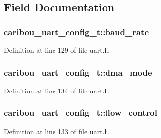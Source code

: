 \subsection{Field Documentation}
\hypertarget{structcaribou__uart__config__t_a6138aeea535f2b07ffe791cf77805e78}{
\subsubsection[{baud\-\_\-rate}]{ caribou\-\_\-uart\-\_\-config\-\_\-t\-::baud\-\_\-rate}}\label{structcaribou__uart__config__t_a6138aeea535f2b07ffe791cf77805e78}


Definition at line 129 of file uart.\-h.

\hypertarget{structcaribou__uart__config__t_a257b346e7b980b0f2b089f27cc54569d}{
\subsubsection[{dma\-\_\-mode}]{ caribou\-\_\-uart\-\_\-config\-\_\-t\-::dma\-\_\-mode}}\label{structcaribou__uart__config__t_a257b346e7b980b0f2b089f27cc54569d}


Definition at line 134 of file uart.\-h.

\hypertarget{structcaribou__uart__config__t_a94d7122367d7664b02df609cbae278c2}{
\subsubsection[{flow\-\_\-control}]{ caribou\-\_\-uart\-\_\-config\-\_\-t\-::flow\-\_\-control}}\label{structcaribou__uart__config__t_a94d7122367d7664b02df609cbae278c2}


Definition at line 133 of file uart.\-h.

